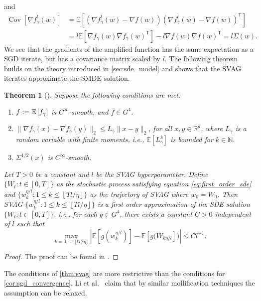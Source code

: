 \documentclass[12pt]{article}
\newtheorem{theorem}{Theorem}[section]
\theoremstyle{definition}
\numberwithin{equation}{section}
\newcommand{\N}{\mathbb{N}}
\newcommand{\R}{\mathbb{R}}
\newcommand{\T}{\mathsf{T}}
\newcommand{\ev}[1]{\mathbb{E}\left[{#1}\right]}
\newcommand{\norm}[1]{\lVert{#1}\rVert_2}
\newcommand{\defeq}{\vcentcolon=}
\DeclareMathOperator{\Cov}{Cov}
\begin{document}
and
\begin{align*}
  \Cov\left[\nabla f^l_{\bar{\gamma}}(w)\right] &= \ev{\left(\nabla f^l_{\bar{\gamma}}(w) - \nabla f(w)\right)\left(\nabla f^l_{\bar{\gamma}}(w) - \nabla f(w)\right)^\T} \\
  &= l\ev{\nabla f_{\gamma}(w)\nabla f_{\gamma}(w)^\T} - l \nabla f(w) \nabla f(w)^\T = l \Sigma(w).
\end{align*}
We see that the gradients of the amplified function has the same expectation as a SGD iterate, but has a covariance matrix scaled by $l$.
The following theorem builds on the theory introduced in \autoref{sec:sde_model} and shows that the SVAG iterates approximate the SMDE solution.
\begin{theorem}[\cite{liValidityModelingSGD2021}]
  \label{thm:svag}
  Suppose the following conditions are met:
  \begin{enumerate}[label=(\roman*)]
    \item $f \defeq \ev{f_{\gamma}}$ is $C^{\infty}$-smooth, and $f \in G^4$.
    \item $\norm{\nabla f_{\gamma}(x) - \nabla f_{\gamma}(y)} \leq L_{\gamma} \norm{x - y}$, for all $x, y \in \R^d$, where $L_{\gamma}$ is a random variable with finite moments, i.e., $\ev{L_{\gamma}^k}$ is bounded for $k \in \N$.
    \item $\Sigma^{1/2}(x)$ is $C^{\infty}$-smooth.
  \end{enumerate}
  Let $T > 0$ be a constant and $l$ be the SVAG hyperparameter. Define $\{W_t : t \in [0,T] \}$ as the stochastic process satisfying equation \eqref{eq:first_order_sde} and $\{w_k^{\eta/l}: 1 \leq k \leq \left\lfloor Tl/\eta \right\rfloor \}$ as the trajectory of SVAG where $w_0 = W_0$. Then SVAG $\{w_k^{\eta/l}: 1 \leq k \leq \left\lfloor Tl/\eta \right\rfloor\}$ is a first order approximation of the SDE solution $\{W_t:t\in [0,T] \}$, i.e., for each $g \in G^4$, there exists a constant $C > 0$ independent of $l$ such that
  \begin{equation*}
    \max_{k=0,\dots, \lfloor lT/\eta \rfloor} \left\lvert \ev{g(w^{\eta/l}_k)} - \ev{g(W_{k\eta/l}}) \right\rvert \leq C l^{-1}.
  \end{equation*}
\end{theorem}
\begin{proof}
  The proof can be found in \cite{liValidityModelingSGD2021}.
\end{proof}
The conditions of \autoref{thm:svag} are more restrictive than the conditions for \autoref{cor:sgd_convergence}. Li et al.\ \cite{liValidityModelingSGD2021} claim that by similar mollification techniques the assumption can be relaxed.
\end{document}
